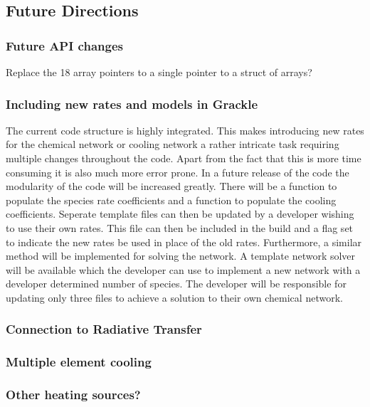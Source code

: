 \subsection{Future Directions} \label{Future_Directions}

\subsubsection{Future API changes} 
Replace the 18 array pointers to a single pointer to a struct of arrays?

\subsubsection{Including new rates and models in Grackle}
\jr{} The current code structure is highly integrated. This makes introducing new rates for the 
chemical network or cooling network a rather intricate task requiring multiple changes throughout the code. 
Apart from the fact that this is more time consuming it is also much more error prone. In a future release of the 
code the modularity of the code will be increased greatly. There will be a function to populate the species 
rate coefficients and a function to populate the cooling coefficients. Seperate template files can then be 
updated by a developer wishing to use their own rates. This file can then be included in the build and a flag
set to indicate the new rates be used in place of the old rates. Furthermore, a similar method will be 
implemented for solving the network. A template network solver will be available which the developer can use to 
implement a new network with a developer determined number of species. The developer will be responsible for
updating only three files to achieve a solution to their own chemical network. 

\subsubsection{Connection to Radiative Transfer}

\subsubsection{Multiple element cooling}

\subsubsection{Other heating sources?}
